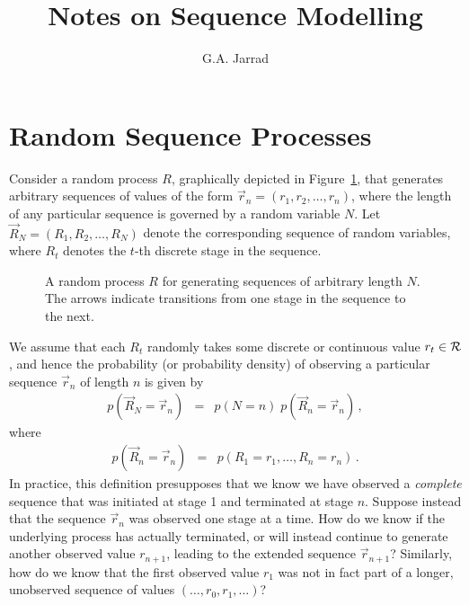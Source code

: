 \documentclass[a4paper]{article}
\title{Notes on Sequence Modelling}
\author{G.A. Jarrad}
\begin{document}
\maketitle
{}
\section{Random Sequence Processes}
\label{sec:random-processes}
Consider a random process $R$, graphically depicted in Figure~\ref{fig:R-process}, that generates arbitrary sequences of values
of the form $\vec{r}_n=(r_1,r_2,\ldots,r_n)$, where the length of any particular sequence is 
governed by a random variable $N$. Let $\vec{R}_N=(R_1,R_2,\ldots,R_N)$ denote
the corresponding sequence of random variables, where $R_t$ denotes the $t$-th discrete stage in the sequence.
\begin{figure}[hbt]
\centering
{}
\caption{A random process $R$ for generating sequences of arbitrary length $N$. The arrows indicate transitions from one stage in the sequence to the next.}
\label{fig:R-process}
\end{figure}

We assume that each $R_t$ randomly takes some discrete or continuous value $r_t\in{\cal R}$,
and hence the probability (or probability density) of observing a particular
sequence $\vec{r}_n$ of length $n$ is given by
\begin{eqnarray}
   p(\vec{R}_N\!=\!\vec{r}_n) & = & p(N=n)\; p(\vec{R}_n\!=\!\vec{r}_n)\,,
\end{eqnarray}
where
\begin{eqnarray}
p(\vec{R}_n\!=\!\vec{r}_n) & = & p(R_1\!=\!r_1,\ldots,R_n\!=\!r_n)\,.
\end{eqnarray}
In practice, this definition presupposes that we know we have observed a {\em complete} sequence that was initiated
at stage 1 and terminated at stage $n$.
Suppose instead that the sequence $\vec{r}_n$ was observed one stage at a time. How do we know if the
underlying process has actually terminated, or will instead
continue to generate another observed value
$r_{n+1}$, leading to the extended sequence $\vec{r}_{n+1}$? 
Similarly, how do we know that the first observed value $r_1$ was not in fact
part of a longer, unobserved sequence of values $(\ldots,r_0,r_1,\ldots)$?
\end{document}
